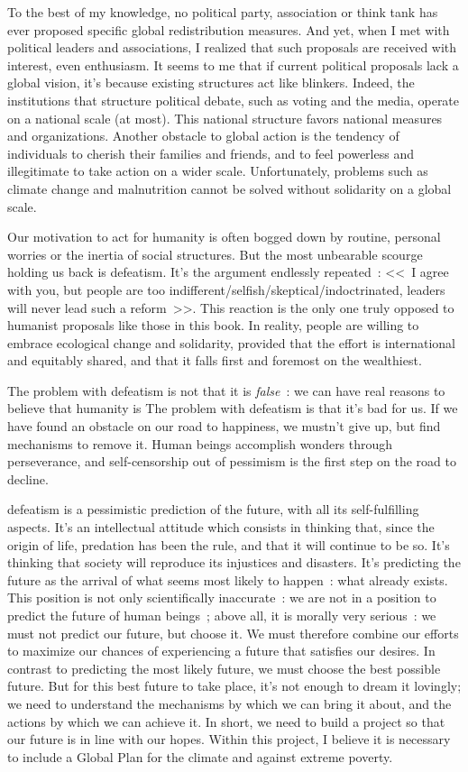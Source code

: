 \documentclass[a5paper,french,openany]{memoir}
\begin{document}
To the best of my knowledge, no political party, association or think tank has ever proposed specific global redistribution measures. And yet, when I met with political leaders and associations, I realized that such proposals are received with interest, even enthusiasm. It seems to me that if current political proposals lack a global vision, it's because existing structures act like blinkers. Indeed, the institutions that structure political debate, such as voting and the media, operate on a national scale (at most). This national structure favors national measures and organizations. Another obstacle to global action is the tendency of individuals to cherish their families and friends, and to feel powerless and illegitimate to take action on a wider scale. %
Unfortunately, problems such as climate change and malnutrition cannot be solved without solidarity on a global scale. 

Our motivation to act for humanity is often bogged down by routine, personal worries or the inertia of social structures. %
But the most unbearable scourge holding us back is defeatism. It's the argument endlessly repeated~: <<~I agree with you, but people are too indifferent/selfish/skeptical/indoctrinated, leaders will never lead such a reform~>>. This reaction is the only one truly opposed to humanist proposals like those in this book. %
In reality, people are willing to embrace ecological change and solidarity, provided that the effort is international and equitably shared, and that it falls first and foremost on the wealthiest. %



The problem with defeatism is not that it is \textit{false}~: we can have real reasons to believe that humanity is %
The problem with defeatism is that it's bad for us. If we have found an obstacle on our road to happiness, we mustn't give up, but find mechanisms to remove it. Human beings accomplish wonders through perseverance, and self-censorship out of pessimism is the first step on the road to decline. 

defeatism %
is a pessimistic prediction of the future, with all its self-fulfilling aspects. It's an intellectual attitude which consists in thinking that, since the origin of life, predation has been the rule, and that it will continue to be so. It's thinking %
that society will reproduce its injustices and disasters. It's predicting the future as the arrival of what seems most likely to happen~: what already exists. This position is not only scientifically inaccurate~: we are not in a position to predict the future of human beings~; above all, it is morally very serious~: we must not predict our future, but choose it. %
We must therefore combine our efforts to maximize our chances of experiencing a future that satisfies our desires. In contrast to predicting the most likely future, we must choose the best possible future. But for this best future to take place, it's not enough to dream it lovingly; we need to understand the mechanisms by which we can bring it about, and the actions by which we can achieve it. In short, we need to build a project so that our future is in line with our hopes.
Within this project, I believe it is necessary to include a Global Plan for the climate and against extreme poverty. %
\end{document}
